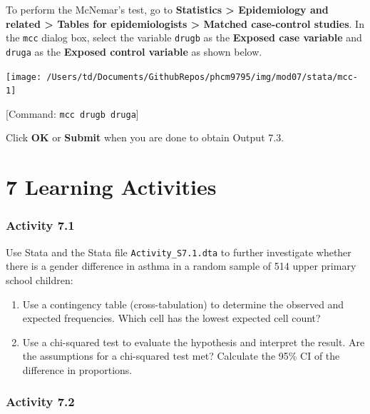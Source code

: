 \documentclass[
]{memoir}
\providecommand{\tightlist}{%
  \setlength{\itemsep}{0pt}\setlength{\parskip}{0pt}}
\begin{document}
To perform the McNemar's test, go to \textbf{Statistics \textgreater{} Epidemiology and related \textgreater{} Tables for epidemiologists \textgreater{} Matched case-control studies}. In the \texttt{mcc} dialog box, select the variable \texttt{drugb} as the \textbf{Exposed case variable} and \texttt{druga} as the \textbf{Exposed control variable} as shown below.

\texttt{[image: /Users/td/Documents/GithubRepos/phcm9795/img/mod07/stata/mcc-1]}

{[}Command: \texttt{mcc\ drugb\ druga}{]}

Click \textbf{OK} or \textbf{Submit} when you are done to obtain Output 7.3.

\hypertarget{learning-activities-6}{%
\chapter*{\texorpdfstring{\textbf{7} Learning Activities}{7 Learning Activities}}\label{learning-activities-6}}

\hypertarget{activity-7.1}{%
\subsection*{Activity 7.1}\label{activity-7.1}}

Use Stata and the Stata file \texttt{Activity\_S7.1.dta} to further investigate whether there is a gender difference in asthma in a random sample of 514 upper primary school children:

\begin{enumerate}
\def\labelenumi{\alph{enumi})}
\tightlist
\item
  Use a contingency table (cross-tabulation) to determine the observed and expected frequencies. Which cell has the lowest expected cell count?
\item
  Use a chi-squared test to evaluate the hypothesis and interpret the result. Are the assumptions for a chi-squared test met? Calculate the 95\% CI of the difference in proportions.
\end{enumerate}

\hypertarget{activity-7.2}{%
\subsection*{Activity 7.2}\label{activity-7.2}}
\end{document}
